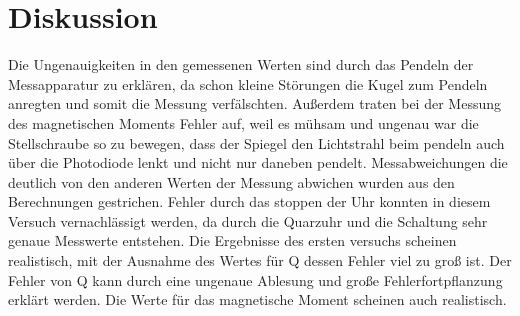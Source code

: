 \newpage
\section{Diskussion}
\label{sec:Diskussion}
Die Ungenauigkeiten in den gemessenen Werten sind durch das Pendeln der Messapparatur zu erklären,
 da schon kleine Störungen die Kugel zum Pendeln anregten und somit die Messung verfälschten.
Außerdem traten bei der Messung des magnetischen Moments Fehler auf,
 weil es mühsam und ungenau war die Stellschraube so zu bewegen,
  dass der Spiegel den Lichtstrahl beim pendeln auch über die Photodiode lenkt und nicht nur daneben pendelt.
Messabweichungen die deutlich von den anderen Werten der Messung abwichen wurden aus den Berechnungen gestrichen.
Fehler durch das stoppen der Uhr konnten in diesem Versuch vernachlässigt werden,
 da durch die Quarzuhr und die Schaltung sehr genaue Messwerte entstehen.
Die Ergebnisse des ersten versuchs scheinen realistisch, mit der Ausnahme des Wertes für Q dessen Fehler viel zu groß ist.
Der Fehler von Q kann durch eine ungenaue Ablesung und große Fehlerfortpflanzung erklärt werden.
Die Werte für das magnetische Moment scheinen auch realistisch.